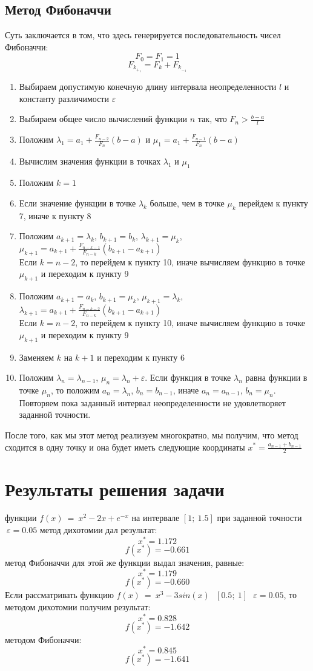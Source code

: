 \documentclass{article}
\begin{document}
\subsection{Метод Фибоначчи}
\noindent Суть заключается в том, что здесь генерируется последовательность чисел Фибоначчи:
$$F_0=F_1=1$$
$$F_k_+_1=F_k+F_k_-_1$$
\begin{enumerate}
		\item Выбираем допустимую конечную длину интервала неопределенности $l$ и константу различимости $\varepsilon$ 
		\item Выбираем общее число вычислений функции $n$ так, что $F_n >\frac{b-a}{l}$
		\item Положим $\lambda_1 = a_1+\frac{F_{n-2}}{F_n}(b-a)$ и  $\mu_1 = a_1+\frac{F_{n-1}}{F_n}(b-a)$
		\item Вычислим значения функции в точках $\lambda_1$ и $\mu_1$
		\item Положим $k = 1$
		\item Если значение функции в точке $\lambda_k$ больше, чем в точке $\mu_k$ перейдем к пункту 7, иначе к пункту 8
		\item Положим $a_{k+1} = \lambda_k$, $b_{k+1} = b_k$, $\lambda_{k+1} = \mu_k$, $\mu_{k+1} = a_{k+1}+\frac{F_{n-k-1}}{F_{n-k}}(b_{k+1}-a_{k+1})$\\
		Если $k = n - 2$, то перейдем к пункту 10, иначе вычисляем функцию в точке $\mu_{k+1}$ и переходим к пункту 9
		\item Положим $a_{k+1} = a_k$, $b_{k+1} = \mu_k$, $\mu_{k+1} = \lambda_k$, $\lambda_{k+1} = a_{k+1}+\frac{F_{n-k-2}}{F_{n-k}}(b_{k+1}-a_{k+1})$\\
		Если $k = n - 2$, то перейдем к пункту 10, иначе вычисляем функцию в точке $\mu_{k+1}$ и переходим к пункту 9
		\item Заменяем $k$ на $k+1$ и переходим к пункту 6
		\item Положим $\lambda_{n} = \lambda_{n-1}$, $\mu_{n} = \lambda_n + \varepsilon$. Если функция в точке $\lambda_n$ равна функции в точке $\mu_n$, то положим $a_n = \lambda_n$, $b_n=b_{n-1}$, иначе $a_n = a_{n-1}$, $b_n=\mu_n$. Повторяем пока заданный интервал неопределенности не удовлетворяет заданной точности.
	\end{enumerate}
	После того, как мы этот метод реализуем многократно, мы получим, что метод сходится в одну точку и она будет иметь следующие координаты $x^{*}=\frac{a_{n-1}+b_{n-1}}{2}$

\section{Результаты решения задачи}
 функции $f(x)~=~x^{2}-2x+e^{-x}$ на интервале $[1;~1.5]$ при заданной точности $~\varepsilon=0.05$ метод дихотомии дал результат:
$$x^{*} = 1.172$$
$$f(x^{*}) = -0.661$$
метод Фибоначчи для этой же функции выдал значения, равные: 
$$x^{*} = 1.179$$
$$f(x^{*}) = -0.660$$
Если рассматривать функцию $f(x)~=~x^{3}-3sin(x)~~~[0.5;~1]~~~\varepsilon=0.05 $, то методом дихотомии получим результат:
$$x^{*} = 0.828$$
$$f(x^{*})=-1.642$$
методом Фибоначчи:
$$x^{*} = 0.845$$
$$f(x^{*})=-1.641$$
\end{document}
